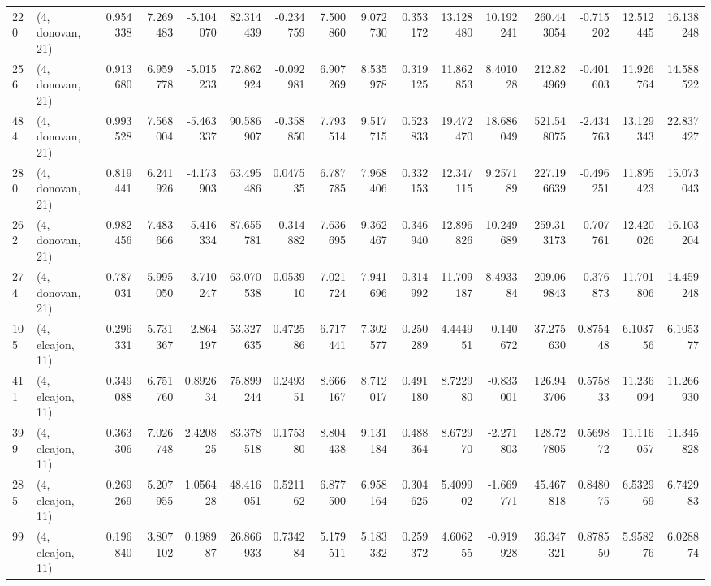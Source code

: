 \begin{tabular}{llrrrrrrrrrrrrrr}
220 &  (4, donovan, 21) &   0.954338 &   7.269483 &  -5.104070 &    82.314439 &  -0.234759 &   7.500860 &   9.072730 &  0.353172 &  13.128480 &  10.192241 &   260.443054 & -0.715202 &  12.512445 &  16.138248 \\
256 &  (4, donovan, 21) &   0.913680 &   6.959778 &  -5.015233 &    72.862924 &  -0.092981 &   6.907269 &   8.535978 &  0.319125 &  11.862853 &   8.401028 &   212.824969 & -0.401603 &  11.926764 &  14.588522 \\
484 &  (4, donovan, 21) &   0.993528 &   7.568004 &  -5.463337 &    90.586907 &  -0.358850 &   7.793514 &   9.517715 &  0.523833 &  19.472470 &  18.686049 &   521.548075 & -2.434763 &  13.129343 &  22.837427 \\
280 &  (4, donovan, 21) &   0.819441 &   6.241926 &  -4.173903 &    63.495486 &   0.047535 &   6.787785 &   7.968406 &  0.332153 &  12.347115 &   9.257189 &   227.196639 & -0.496251 &  11.895423 &  15.073043 \\
262 &  (4, donovan, 21) &   0.982456 &   7.483666 &  -5.416334 &    87.655781 &  -0.314882 &   7.636695 &   9.362467 &  0.346940 &  12.896826 &  10.249689 &   259.313173 & -0.707761 &  12.420026 &  16.103204 \\
274 &  (4, donovan, 21) &   0.787031 &   5.995050 &  -3.710247 &    63.070538 &   0.053910 &   7.021724 &   7.941696 &  0.314992 &  11.709187 &   8.493384 &   209.069843 & -0.376873 &  11.701806 &  14.459248 \\
105 &  (4, elcajon, 11) &   0.296331 &   5.731367 &  -2.864197 &    53.327635 &   0.472586 &   6.717441 &   7.302577 &  0.250289 &   4.444951 &  -0.140672 &    37.275630 &  0.875448 &   6.103756 &   6.105377 \\
411 &  (4, elcajon, 11) &   0.349088 &   6.751760 &   0.892634 &    75.899244 &   0.249351 &   8.666167 &   8.712017 &  0.491180 &   8.722980 &  -0.833001 &   126.943706 &  0.575833 &  11.236094 &  11.266930 \\
399 &  (4, elcajon, 11) &   0.363306 &   7.026748 &   2.420825 &    83.378518 &   0.175380 &   8.804438 &   9.131184 &  0.488364 &   8.672970 &  -2.271803 &   128.727805 &  0.569872 &  11.116057 &  11.345828 \\
285 &  (4, elcajon, 11) &   0.269269 &   5.207955 &   1.056428 &    48.416051 &   0.521162 &   6.877500 &   6.958164 &  0.304625 &   5.409902 &  -1.669771 &    45.467818 &  0.848075 &   6.532969 &   6.742983 \\
99  &  (4, elcajon, 11) &   0.196840 &   3.807102 &   0.198987 &    26.866933 &   0.734284 &   5.179511 &   5.183332 &  0.259372 &   4.606255 &  -0.919928 &    36.347321 &  0.878550 &   5.958276 &   6.028874 \\

\end{tabular}
